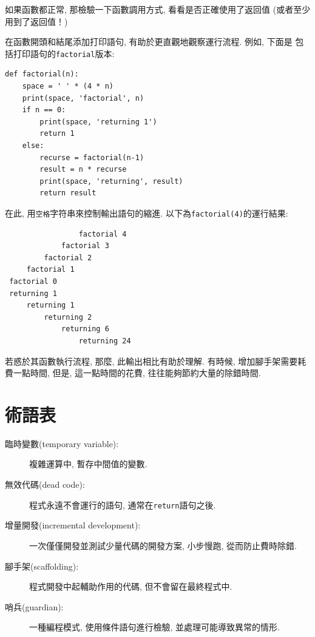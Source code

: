 \documentclass[10pt]{book}
\begin{document}
如果函數都正常, 那檢驗一下函數調用方式, 看看是否正確使用了返回值
(或者至少用到了返回值！)

在函數開頭和結尾添加打印語句, 有助於更直觀地觀察運行流程. 例如, 下面是
包括打印語句的{\tt factorial}版本:

\begin{verbatim}
def factorial(n):
    space = ' ' * (4 * n)
    print(space, 'factorial', n)
    if n == 0:
        print(space, 'returning 1')
        return 1
    else:
        recurse = factorial(n-1)
        result = n * recurse
        print(space, 'returning', result)
        return result
\end{verbatim}
%
在此, 用{\tt 空格}字符串來控制輸出語句的縮進. 以下為{\tt factorial(4)}的運行結果:

\begin{verbatim}
                 factorial 4
             factorial 3
         factorial 2
     factorial 1
 factorial 0
 returning 1
     returning 1
         returning 2
             returning 6
                 returning 24
\end{verbatim}
%
若惑於其函數執行流程, 那麼, 此輸出相比有助於理解. 
有時候, 增加腳手架需要耗費一點時間, 
但是, 這一點時間的花費, 往往能夠節約大量的除錯時間. 

\section{術語表}

\begin{description}

\item[臨時變數(temporary variable):] 複雜運算中, 暫存中間值的變數. 

\item[無效代碼(dead code):]  程式永遠不會運行的語句, 通常在{\tt return}語句之後. 

\item[增量開發(incremental development):]  一次僅僅開發並測試少量代碼的開發方案, 
小步慢跑, 從而防止費時除錯. 

\item[腳手架(scaffolding):]  程式開發中起輔助作用的代碼, 但不會留在最終程式中. 

\item[哨兵(guardian):]  一種編程模式, 使用條件語句進行檢驗, 並處理可能導致異常的情形. 

\end{description}
\end{document}
